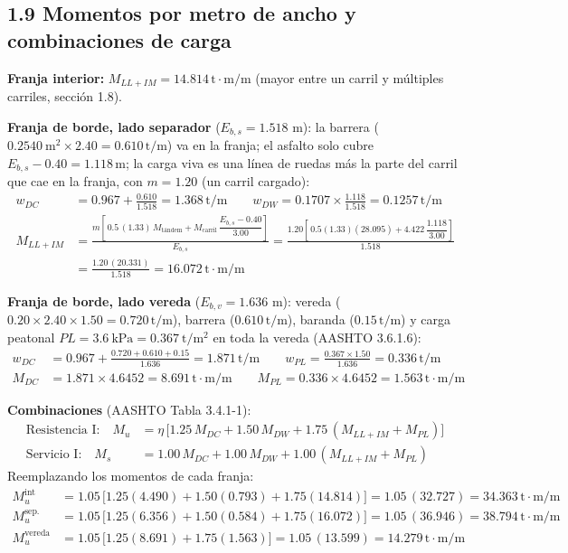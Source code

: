 \documentclass[11pt,a4paper]{article}
\newcommand{\uTmm}{\,\mathrm{t{\cdot}m/m}}
\newcommand{\uTpm}{\,\mathrm{t/m}}
\newcommand{\uM}{\,\mathrm{m}}
\begin{document}
\subsection*{1.9 Momentos por metro de ancho y combinaciones de carga}
\textbf{Franja interior:} $M_{LL+IM} = 14.814\uTmm$ (mayor entre un carril y múltiples carriles, sección 1.8).

\textbf{Franja de borde, lado separador} ($E_{b,s} = 1.518$ m): la barrera
($0.2540\ \mathrm{m^2}\times 2.40 = 0.610\uTpm$) va en la franja; el asfalto solo cubre
$E_{b,s} - 0.40 = 1.118\uM$; la carga viva es una línea de ruedas más la parte del carril que
cae en la franja, con $m = 1.20$ (un carril cargado):
\begin{align*}
w_{DC} &= 0.967 + \frac{0.610}{1.518} = 1.368\uTpm \qquad
w_{DW} = 0.1707\times\frac{1.118}{1.518} = 0.1257\uTpm\\
M_{LL+IM} &= \frac{m\left[\,0.5\,(1.33)\,M_{\text{tándem}} + M_{\text{carril}}\,\dfrac{E_{b,s} - 0.40}{3.00}\right]}{E_{b,s}}
 = \frac{1.20\left[\,0.5(1.33)(28.095) + 4.422\,\dfrac{1.118}{3.00}\right]}{1.518}\\
 &= \frac{1.20\,(20.331)}{1.518} = 16.072\uTmm
\end{align*}

\textbf{Franja de borde, lado vereda} ($E_{b,v} = 1.636$ m): vereda ($0.20 \times 2.40 \times 1.50
= 0.720\uTpm$), barrera ($0.610\uTpm$), baranda ($0.15\uTpm$) y carga peatonal
$PL = 3.6\ \text{kPa} = 0.367\ \mathrm{t/m^2}$ en toda la vereda (AASHTO 3.6.1.6):
\begin{align*}
w_{DC} &= 0.967 + \frac{0.720 + 0.610 + 0.15}{1.636} = 1.871\uTpm \qquad
w_{PL} = \frac{0.367 \times 1.50}{1.636} = 0.336\uTpm\\
M_{DC} &= 1.871 \times 4.6452 = 8.691\uTmm \qquad M_{PL} = 0.336 \times 4.6452 = 1.563\uTmm
\end{align*}

\textbf{Combinaciones} (AASHTO Tabla 3.4.1-1):
\begin{align*}
\text{Resistencia I:}\quad M_u &= \eta\,\big[1.25\,M_{DC} + 1.50\,M_{DW} + 1.75\,(M_{LL+IM} + M_{PL})\big]\\
\text{Servicio I:}\quad M_s &= 1.00\,M_{DC} + 1.00\,M_{DW} + 1.00\,(M_{LL+IM} + M_{PL})
\end{align*}
Reemplazando los momentos de cada franja:
\begin{align*}
M_u^{\text{int}} &= 1.05\,\big[1.25(4.490) + 1.50(0.793) + 1.75(14.814)\big] = 1.05\,(32.727)
 = \boxed{34.363\uTmm}\\
M_u^{\text{sep.}} &= 1.05\,\big[1.25(6.356) + 1.50(0.584) + 1.75(16.072)\big] = 1.05\,(36.946)
 = \boxed{38.794\uTmm}\\
M_u^{\text{vereda}} &= 1.05\,\big[1.25(8.691) + 1.75(1.563)\big] = 1.05\,(13.599)
 = \boxed{14.279\uTmm}
\end{align*}
\end{document}

